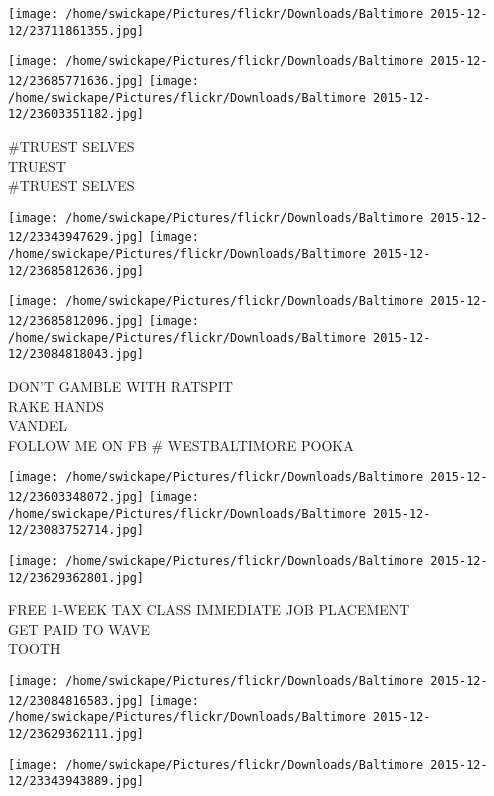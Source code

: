 \documentclass[10pt,letterpaper]{article}
\begin{document}
\texttt{[image: /home/swickape/Pictures/flickr/Downloads/Baltimore 2015-12-12/23711861355.jpg]}

\vspace{0.25in}
\texttt{[image: /home/swickape/Pictures/flickr/Downloads/Baltimore 2015-12-12/23685771636.jpg]}
\texttt{[image: /home/swickape/Pictures/flickr/Downloads/Baltimore 2015-12-12/23603351182.jpg]}

\#TRUEST SELVES\\
TRUEST\\
\#TRUEST SELVES\\
\pagebreak

\texttt{[image: /home/swickape/Pictures/flickr/Downloads/Baltimore 2015-12-12/23343947629.jpg]}
\texttt{[image: /home/swickape/Pictures/flickr/Downloads/Baltimore 2015-12-12/23685812636.jpg]}

\texttt{[image: /home/swickape/Pictures/flickr/Downloads/Baltimore 2015-12-12/23685812096.jpg]}
\texttt{[image: /home/swickape/Pictures/flickr/Downloads/Baltimore 2015-12-12/23084818043.jpg]}

DON'T GAMBLE WITH RATSPIT\\
RAKE HANDS\\
VANDEL\\
FOLLOW ME ON FB \# WESTBALTIMORE POOKA\\
\pagebreak

\texttt{[image: /home/swickape/Pictures/flickr/Downloads/Baltimore 2015-12-12/23603348072.jpg]}
\texttt{[image: /home/swickape/Pictures/flickr/Downloads/Baltimore 2015-12-12/23083752714.jpg]}

\vspace{0.25in}
\texttt{[image: /home/swickape/Pictures/flickr/Downloads/Baltimore 2015-12-12/23629362801.jpg]}

FREE 1{-}WEEK TAX CLASS IMMEDIATE JOB PLACEMENT\\
GET PAID TO WAVE\\
TOOTH\\
\pagebreak

\texttt{[image: /home/swickape/Pictures/flickr/Downloads/Baltimore 2015-12-12/23084816583.jpg]}
\texttt{[image: /home/swickape/Pictures/flickr/Downloads/Baltimore 2015-12-12/23629362111.jpg]}

\vspace{0.25in}
\texttt{[image: /home/swickape/Pictures/flickr/Downloads/Baltimore 2015-12-12/23343943889.jpg]}
\end{document}
